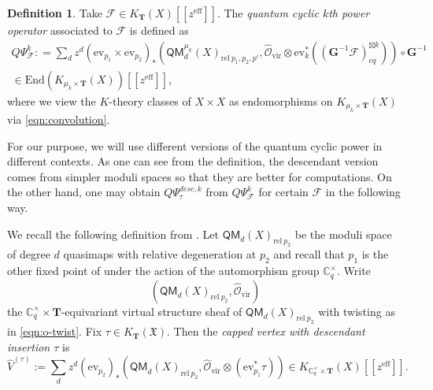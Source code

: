 \documentclass[reqno]{amsart}
\numberwithin{equation}{section}
\numberwithin{equation}{section}
\numberwithin{equation}{section}
\theoremstyle{definition}
\newtheorem{defn}[thm]{Definition}
\theoremstyle{remark}
\theoremstyle{remark}
\begin{document}
\begin{defn}
    Take $\mathcal{F} \in K_{\mathbf{T}}(X)[\![ z^{\mathrm{eff}} ]\!]$. The \emph{quantum cyclic $k$th power operator} associated to $\mathcal{F}$ is defined as
    \begin{equation}\label{eqn:power}
    \begin{aligned}
        Q\Psi^k_{\mathcal{F}}: = \sum_{d} z^d (\mathrm{ev}_{p_1} \times \mathrm{ev}_{p_2})_* \left( \mathsf{QM}_d^{\mu_k}(X)_{\mathrm{rel} \  p_1,p_2, p'}, \hat{\mathcal{O}}_{\mathrm{vir}} \otimes \mathrm{ev}_k^* ((\mathbf{G}^{-1}\mathcal{F})^{\boxtimes k}_{eq}) \right) \circ \mathbf{G}^{-1} \\ \in \mathrm{End}(K_{\mu_k \times \mathbf{T}}(X))[\![ z^{\mathrm{eff}} ]\!],
    \end{aligned}
    \end{equation}
    where we view the $K$-theory classes of $X \times X$ as endomorphisms on $K_{\mu_k \times \mathbf{T}}(X)$ via \eqref{eqn:convolution}.
\end{defn}

For our purpose, we will use different versions of the quantum cyclic power in different contexts. As one can see from the definition, the descendant version comes from simpler moduli spaces so that they are better for computations. On the other hand, one may obtain $Q\Psi_\tau^{desc, k}$ from $Q\Psi^k_{\mathcal{F}}$ for certain $\mathcal{F}$ in the following way.

We recall the following definition from \cite[Section 7.4.1]{Oko17}. Let $\mathsf{QM}_d(X)_{\mathrm{rel} \  p_2}$ be the moduli space of degree $d$ quasimaps with relative degeneration at $p_2$ and recall that $p_1$ is the other fixed point of under the action of the automorphism group $\mathbb{C}^{\times}_q$. Write
\begin{equation}
    (\mathsf{QM}_d(X)_{\mathrm{rel} \ p_2}, \hat{\mathcal{O}}_{\mathrm{vir}})
\end{equation}
the $\mathbb{C}^{\times}_q \times \mathbf{T}$-equivariant virtual structure sheaf of $\mathsf{QM}_d(X)_{\mathrm{rel} \ p_2}$ with twisting as in \eqref{eqn:o-twist}. Fix $\tau \in K_{\mathbf{T}}(\mathfrak{X})$. Then the \emph{capped vertex with descendant insertion $\tau$} is
    \begin{equation}
        \widehat{V}^{(\tau)} := \sum_d z^d (\mathrm{ev}_{p_2})_* \left( \mathsf{QM}_d(X)_{\mathrm{rel} \ p_2}, \hat{\mathcal{O}}_{\mathrm{vir}} \otimes (\mathrm{ev}_{p_1}^* \tau) \right) \in K_{\mathbb{C}^{\times}_q \times \mathbf{T}}(X) [\![z^{\mathrm{eff}}]\!].
    \end{equation}
\end{document}
